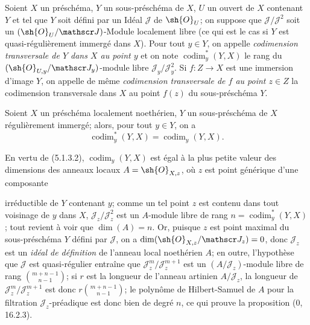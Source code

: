 \begin{definition}[19.1.3]
\label{IV.19.1.3}
Soient $X$ un préschéma, $Y$ un sous-préschéma de $X$, $U$ un ouvert de $X$ contenant $Y$ et tel que $Y$ soit défini par un Idéal $\mathscr J$ de $\sh{O}_U$; on suppose que $\mathscr J/\mathscr J^2$ soit un $(\sh{O}_U/\mathscr J)$-Module localement libre (ce qui est le cas si $Y$ est quasi-régulièrement immergé dans $X$). Pour tout $y\in Y$, on appelle \emph{codimension transversale de $Y$ dans $X$ au point $y$} et on note $\operatorname{codim}_y^*(Y,X)$ le rang du $(\sh{O}_{U,y}/\mathscr J_y)$-module libre $\mathscr J_y/\mathscr J_y^2$. Si $f:Z\to X$ est une immersion d'image $Y$, on appelle de même \emph{codimension transversale de $f$ au point $z\in Z$} la codimension transversale dans $X$ au point $f(z)$ du sous-préschéma $Y$.
\end{definition}

\begin{proposition}[19.1.4]
\label{IV.19.1.4}
Soient $X$ un préschéma localement noethérien, $Y$ un sous-préschéma de $X$ régulièrement immergé; alors, pour tout $y\in Y$, on a
\begin{equation}
  \operatorname{codim}_y^*(Y,X)=\operatorname{codim}_y(Y,X).
  \tag{19.1.4.1}\label{IV.19.1.4.1}
\end{equation}
\end{proposition}

En vertu de (5.1.3.2), $\operatorname{codim}_y(Y,X)$ est égal à la plus petite valeur des dimensions des anneaux locaux $A=\sh{O}_{X,z}$, où $z$ est point générique d'une composante


irréductible de $Y$ contenant $y$; comme un tel point $z$ est contenu dans tout voisinage de $y$ dans $X$, $\mathscr J_z/\mathscr J_z^2$ est un $A$-module libre de rang $n=\operatorname{codim}_y^*(Y,X)$; tout revient à voir que $\dim(A)=n$. Or, puisque $z$ est point maximal du sous-préschéma $Y$ défini par $\mathscr J$, on a $\dim(\sh{O}_{X,z}/\mathscr J_z)=0$, donc $\mathscr J_z$ est un \emph{idéal de définition} de l'anneau local noethérien $A$; en outre, l'hypothèse que $\mathscr J$ est quasi-régulier entraîne que $\mathscr J_z^m/\mathscr J_z^{m+1}$ est un $(A/\mathscr J_z)$-module libre de rang $\binom{m+n-1}{n-1}$; si $r$ est la longueur de l'anneau artinien $A/\mathscr J_z$, la longueur de $\mathscr J_z^m/\mathscr J_z^{m+1}$ est donc $r\binom{m+n-1}{n-1}$; le polynôme de Hilbert-Samuel de $A$ pour la filtration $\mathscr J_z$-préadique est donc bien de degré $n$, ce qui prouve la proposition ($0$, 16.2.3).


